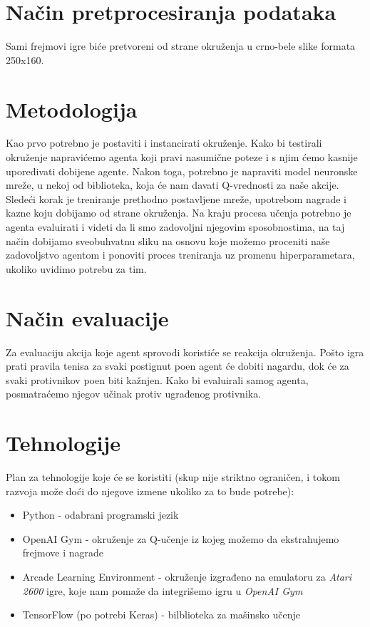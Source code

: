 \documentclass[12pt, a4paper]{article}
\begin{document}
\section{Način pretprocesiranja podataka}

Sami frejmovi igre biće pretvoreni od strane okruženja u crno-bele slike formata 250x160. 

\section{Metodologija}

Kao prvo potrebno je postaviti i instancirati okruženje. Kako bi testirali okruženje napravićemo agenta koji pravi nasumične poteze i s njim ćemo kasnije upoređivati dobijene agente. Nakon toga, potrebno je napraviti model neuronske mreže, u nekoj od biblioteka, koja će nam davati Q-vrednosti za naše akcije. Sledeći korak je treniranje prethodno postavljene mreže, upotrebom nagrade i kazne koju dobijamo od strane okruženja. Na kraju procesa učenja potrebno je agenta evaluirati i videti da li smo zadovoljni njegovim sposobnostima, na taj način dobijamo sveobuhvatnu sliku na osnovu koje možemo proceniti naše zadovoljstvo agentom i ponoviti proces treniranja uz promenu hiperparametara, ukoliko uvidimo potrebu za tim.

\section{Način evaluacije}

Za evaluaciju akcija koje agent sprovodi koristiće se reakcija okruženja. Pošto igra prati pravila tenisa za svaki postignut poen agent će dobiti nagardu, dok će za svaki protivnikov poen biti kažnjen. Kako bi evaluirali samog agenta, posmatraćemo njegov učinak protiv ugrađenog protivnika.

\section{Tehnologije}

Plan za tehnologije koje će se koristiti (skup nije striktno ograničen, i tokom razvoja može doći do njegove izmene ukoliko za to bude potrebe): 

\begin{itemize}
	\item Python - odabrani programski jezik
	\item OpenAI Gym - okruženje za Q-učenje iz kojeg možemo da ekstrahujemo frejmove i nagrade
	\item Arcade Learning Environment - okruženje izgrađeno na emulatoru za \textit{Atari 2600} igre, koje nam pomaže da integrišemo igru u \textit{OpenAI Gym}
	\item TensorFlow (po potrebi Keras) - bilblioteka za mašinsko učenje
	
\end{itemize}
\end{document}
